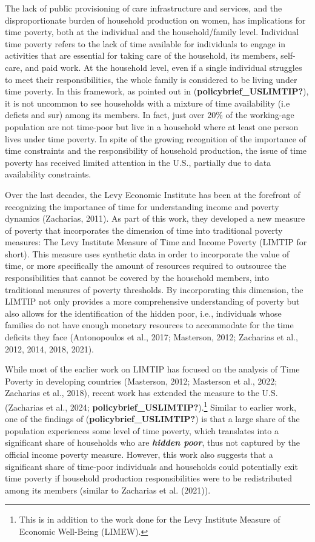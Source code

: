 \documentclass[
  11pt,
]{article}
\begin{document}
The lack of public provisioning of care infrastructure and services, and
the disproportionate burden of household production on women, has
implications for time poverty, both at the individual and the
household/family level. Individual time poverty refers to the lack of
time available for individuals to engage in activities that are
essential for taking care of the household, its members, self-care, and
paid work. At the household level, even if a single individual struggles
to meet their responsibilities, the whole family is considered to be
living under time poverty. In this framework, as pointed out in
(\textbf{policybrief\_USLIMTIP?}), it is not uncommon to see households
with a mixture of time availability (i.e deficts and sur) among its
members. In fact, just over 20\% of the working-age population are not
time-poor but live in a household where at least one person lives under
time poverty. In spite of the growing recognition of the importance of
time constraints and the responsibility of household production, the
issue of time poverty has received limited attention in the U.S.,
partially due to data availability constraints.

Over the last decades, the Levy Economic Institute has been at the
forefront of recognizing the importance of time for understanding income
and poverty dynamics (Zacharias, 2011). As part of this work, they
developed a new measure of poverty that incorporates the dimension of
time into traditional poverty measures: The Levy Institute Measure of
Time and Income Poverty (LIMTIP for short). This measure uses synthetic
data in order to incorporate the value of time, or more specifically the
amount of resources required to outsource the responsibilities that
cannot be covered by the household members, into traditional measures of
poverty thresholds. By incorporating this dimension, the LIMTIP not only
provides a more comprehensive understanding of poverty but also allows
for the identification of the hidden poor, i.e., individuals whose
families do not have enough monetary resources to accommodate for the
time deficits they face (Antonopoulos et al., 2017; Masterson, 2012;
Zacharias et al., 2012, 2014, 2018, 2021).

While most of the earlier work on LIMTIP has focused on the analysis of
Time Poverty in developing countries (Masterson, 2012; Masterson et al.,
2022; Zacharias et al., 2018), recent work has extended the measure to
the U.S. (Zacharias et al., 2024;
\textbf{policybrief\_USLIMTIP?}).\footnote{This is in addition to the
  work done for the Levy Institute Measure of Economic Well-Being
  (LIMEW).} Similar to earlier work, one of the findings of
(\textbf{policybrief\_USLIMTIP?}) is that a large share of the
population experiences some level of time poverty, which translates into
a significant share of households who are \textbf{\emph{hidden poor}},
thus not captured by the official income poverty measure. However, this
work also suggests that a significant share of time-poor individuals and
households could potentially exit time poverty if household production
responsibilities were to be redistributed among its members (similar to
Zacharias et al. (2021)).
\end{document}
